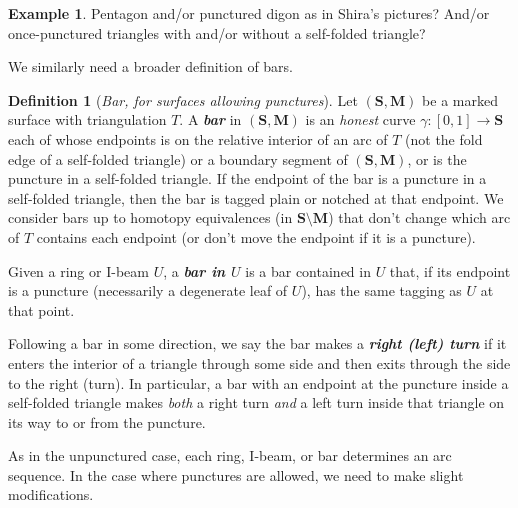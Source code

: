\documentclass{amsart}
\theoremstyle{definition}
\newtheorem{example}[proposition]{Example}
\newtheorem{definition}[proposition]{Definition}
\theoremstyle{remark}
\numberwithin{equation}{section}
\newcommand{\newword}[1]{\textbf{\emph{#1}}}
\newcommand{\0}{{\mathbf{0}}}
\newcommand{\M}{\mathbf{M}}
\renewcommand{\S}{\mathbf{S}}
\begin{document}
\begin{example}\label{I-beam ex}
Pentagon and/or punctured digon as in Shira's pictures?
And/or once-punctured triangles with and/or without a self-folded triangle?
\end{example}

We similarly need a broader definition of bars.

\begin{definition}[\emph{Bar, for surfaces allowing punctures}]\label{bar def}
Let $(\S,\M)$ be a marked surface with triangulation $T$.  
A \newword{bar} in $(\S,\M)$ is an \emph{honest} curve $\gamma:[0,1]\to\S$ each of whose endpoints is on the relative interior of an arc of $T$ (not the fold edge of a self-folded triangle) or a boundary segment of $(\S,\M)$, or is the puncture in a self-folded triangle.  
If the endpoint of the bar is a puncture in a self-folded triangle, then the bar is tagged plain or notched at that endpoint.
We consider bars up to homotopy equivalences (in $\S\setminus\M$) that don't change which arc of $T$ contains each endpoint (or don't move the endpoint if it is a puncture).

Given a ring or I-beam $U$, a \newword{bar in $U$} is a bar contained in $U$ that, if its endpoint is a puncture (necessarily a degenerate leaf of $U$), has the same tagging as $U$ at that point.

Following a bar in some direction, we say the bar makes a \newword{right (left) turn} if it enters the interior of a triangle through some side and then exits through the side to the right (turn).
In particular, a bar with an endpoint at the puncture inside a self-folded triangle makes \emph{both} a right turn \emph{and} a left turn inside that triangle on its way to or from the puncture.
\end{definition}

As in the unpunctured case, each ring, I-beam, or bar determines an arc sequence.
In the case where punctures are allowed, we need to make slight modifications.
\end{document}

